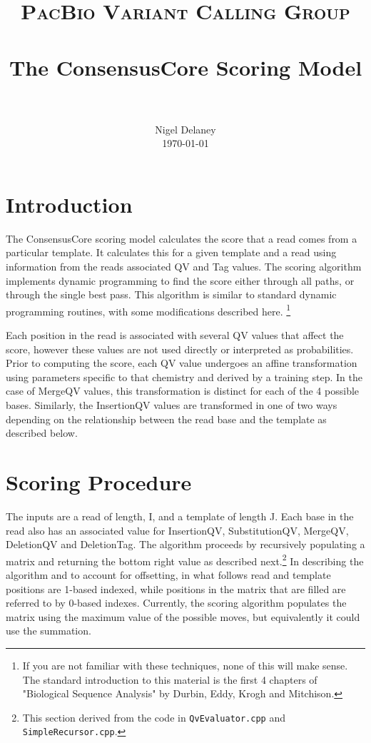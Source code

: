 \documentclass[paper=a4, fontsize=11pt]{scrartcl}
\title{
		\usefont{OT1}{bch}{b}{n}
		\normalfont \normalsize \textsc{PacBio Variant Calling Group} \\ [25pt]
		\horrule{0.5pt} \\[0.4cm]
		\huge The ConsensusCore Scoring Model \\
		\horrule{2pt} \\[0.5cm]
}
\author{
		\normalfont 								\normalsize
        Nigel Delaney\\[-3pt]		\normalsize
        \today
}
\date{}
\numberwithin{equation}{section}		%
\numberwithin{figure}{section}			%
\numberwithin{table}{section}				%
\begin{document}
\maketitle
\section{Introduction}

The ConsensusCore scoring model calculates the score that a read comes from a particular template.  It calculates this for a given template and a read using information from the reads associated QV and Tag values.  The scoring algorithm implements dynamic programming to find the score either through all paths, or through the single best pass.  This algorithm is similar to standard dynamic programming routines, with some modifications described here. \footnote{If you are not familiar with these techniques, none of this will make sense.  The standard introduction to this material is the first 4 chapters of "Biological Sequence Analysis" by Durbin, Eddy, Krogh and Mitchison.}

Each position in the read is associated with several QV values that affect the score, however these values are not used directly or interpreted as probabilities.  Prior to computing the score, each QV value undergoes an affine transformation using parameters specific to that chemistry and derived by a training step.  In the case of MergeQV values, this transformation is distinct for each of the 4 possible bases. Similarly, the InsertionQV values are transformed in one of two ways depending on the relationship between the read base and the template as described below.
 




\section{ Scoring Procedure} 

The inputs are a read of length, I, and a template of length J.  Each base in the read also has an associated value for InsertionQV, SubstitutionQV, MergeQV, DeletionQV and DeletionTag.  The algorithm proceeds by recursively populating a matrix and returning the bottom right value as described next.\footnote{This section derived from the code in \texttt{QvEvaluator.cpp} and \texttt{SimpleRecursor.cpp}.}  In describing the algorithm and to account for offsetting, in what follows read and template positions are 1-based indexed, while positions in the matrix that are filled are referred to by 0-based indexes. Currently, the scoring algorithm populates the matrix using the maximum value of the possible moves, but equivalently it could use the summation.
\end{document}

